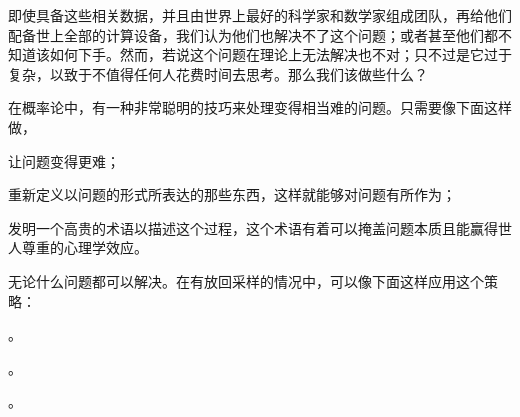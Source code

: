 即使具备这些相关数据，并且由世界上最好的科学家和数学家组成团队，再给他们配备世上全部的计算设备，我们认为他们也解决不了这个问题；或者甚至他们都不知道该如何下手。然而，若说这个问题在理论上无法解决也不对；只不过是它过于复杂，以致于不值得任何人花费时间去思考。那么我们该做些什么？

在概率论中，有一种非常聪明的技巧来处理变得相当难的问题。只需要像下面这样做，

\startsmallitemize[n]
\item 让问题变得更难；
\item 重新定义以问题的形式所表达的那些东西，这样就能够对问题有所作为；
\item 发明一个高贵的术语以描述这个过程，这个术语有着可以掩盖问题本质且能赢得世人尊重的心理学效应。
\stopsmallitemize

无论什么问题都可以解决。在有放回采样的情况中，可以像下面这样应用这个策略：

\startsmallitemize[n]
\item 。
\item 。
\item 。
\stopsmallitemize
